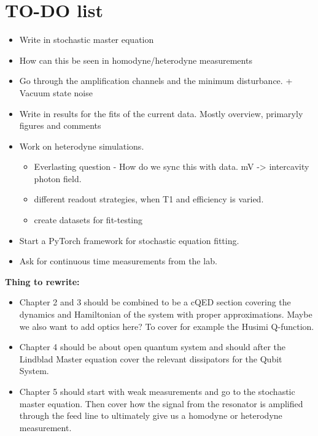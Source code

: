 \chapter*{TO-DO list }
\begin{itemize}
    \item Write in stochastic master equation
    \item How can this be seen in homodyne/heterodyne measurements
    \item Go through the amplification channels and the minimum disturbance. + Vacuum state noise
    \item Write in results for the fits of the current data. Mostly overview, primaryly figures and comments
    \item Work on heterodyne simulations.
    \begin{itemize}
        \item Everlasting question - How do we sync this with data. mV -> intercavity photon field.
        \item different readout strategies, when T1 and efficiency is varied.
        \item create datasets for fit-testing
    \end{itemize}
    \item Start a PyTorch framework for stochastic equation fitting.
    \item Ask for continuous time measurements from the lab. 
\end{itemize}

\vspace{1 cm}
\noindent
\textbf{Thing to rewrite:}
\begin{itemize}
    \item  Chapter 2 and 3 should be combined to be a cQED section covering the dynamics and Hamiltonian of the system with proper approximations. Maybe we also want to add optics here? To cover for example the Husimi Q-function.
    \item Chapter 4 should be about open quantum system and should after the Lindblad Master equation cover the relevant dissipators for the Qubit System.
    \item Chapter 5 should start with weak measurements and go to the stochastic master equation. Then cover how the signal from the resonator is amplified through the feed line to ultimately give us a homodyne or heterodyne measurement. 
\end{itemize}